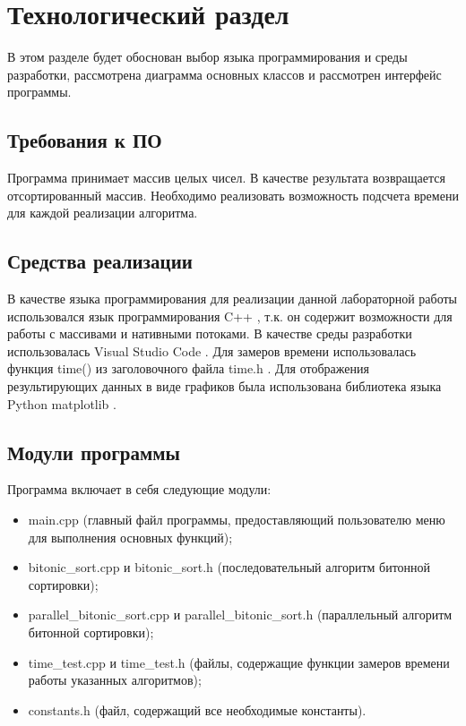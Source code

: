 \chapter{Технологический раздел}
\label{cha:impl}

В этом разделе будет обоснован выбор языка программирования и среды разработки, рассмотрена диаграмма основных классов и рассмотрен интерфейс программы.

\section{Требования к ПО}

Программа принимает массив целых чисел. В качестве результата возвращается отсортированный массив. Необходимо реализовать возможность подсчета времени для каждой реализации алгоритма.

\section{Средства реализации}

В качестве языка программирования для реализации данной лабораторной работы использовался язык программирования C++ \cite{cplusplus}, т.к. он содержит возможности для работы с массивами и нативными потоками. В качестве среды разработки использовалась Visual Studio Code \cite{vscode}. Для замеров времени  использовалась функция time() из заголовочного файла time.h \cite{cplusplus}. Для отображения результирующих данных в виде графиков была использована библиотека языка Python matplotlib \cite{matplotlib}.

\section{Модули программы}

Программа включает в себя следующие модули:
\begin{itemize}
	\item main.cpp (главный файл программы, предоставляющий пользователю меню для выполнения основных функций);
	\item bitonic\_sort.cpp и bitonic\_sort.h (последовательный алгоритм битонной сортировки);
	\item parallel\_bitonic\_sort.cpp и parallel\_bitonic\_sort.h (параллельный алгоритм битонной сортировки);
	\item time\_test.cpp и time\_test.h (файлы, содержащие функции замеров времени работы указанных алгоритмов);
	\item constants.h (файл, содержащий все необходимые константы).
\end{itemize}

